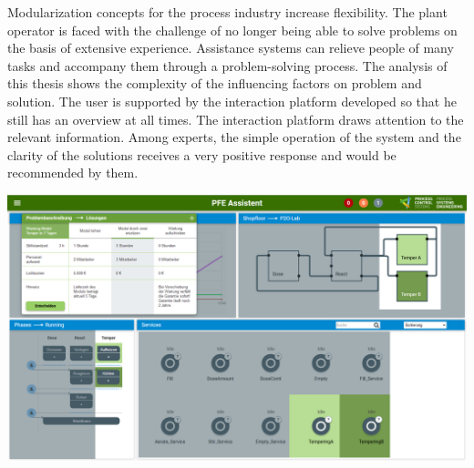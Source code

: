 Modularization concepts for the process industry increase flexibility. The plant operator is faced with the challenge of no longer being able to solve problems on the basis of extensive experience. Assistance systems can relieve people of many tasks and accompany them through a problem-solving process. The analysis of this thesis shows the complexity of the influencing factors on problem and solution. The user is supported by the interaction platform developed so that he still has an overview at all times. The interaction platform draws attention to the relevant information. Among experts, the simple operation of the system and the clarity of the solutions receives a very positive response and would be recommended by them.

\vspace{10pt}
\begin{center}
\includegraphics[scale=0.25]{DA_files/Bilder/Konzept/Skizze-Loesungen-PFE.png}
\end{center}
\vspace{6pt}